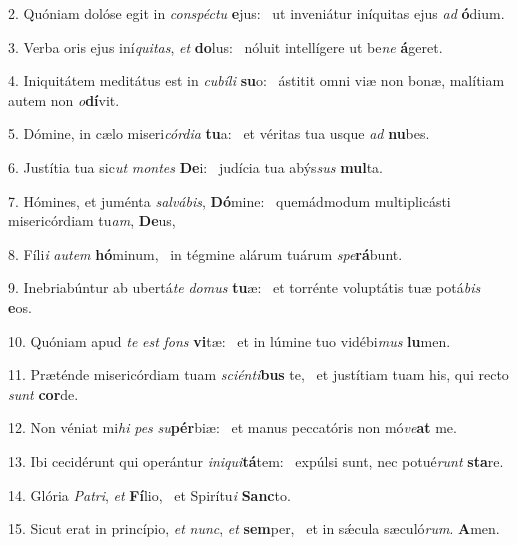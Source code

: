 2. Quóniam dolóse egit in \textit{con}\textit{spéc}\textit{tu} \textbf{e}jus: \ast\  ut inveniátur iníquitas ejus \textit{ad} \textbf{ó}dium.\

3. Verba oris ejus iní\textit{qui}\textit{tas}, \textit{et} \textbf{do}lus: \ast\  nóluit intellígere ut be\textit{ne} \textbf{á}geret.\

4. Iniquitátem meditátus est in \textit{cu}\textit{bí}\textit{li} \textbf{su}o: \ast\  ástitit omni viæ non bonæ, malítiam autem non \textit{o}\textbf{dí}vit.\

5. Dómine, in cælo miseri\textit{cór}\textit{di}\textit{a} \textbf{tu}a: \ast\  et véritas tua usque \textit{ad} \textbf{nu}bes.\

6. Justítia tua sic\textit{ut} \textit{mon}\textit{tes} \textbf{De}i: \ast\  judícia tua abýs\textit{sus} \textbf{mul}ta.\

7. Hómines, et juménta \textit{sal}\textit{vá}\textit{bis}, \textbf{Dó}mine: \ast\  quemádmodum multiplicásti misericórdiam tu\textit{am}, \textbf{De}us,\

8. Fíli\textit{i} \textit{au}\textit{tem} \textbf{hó}minum, \ast\  in tégmine alárum tuárum \textit{spe}\textbf{rá}bunt.\

9. Inebriabúntur ab ubertá\textit{te} \textit{do}\textit{mus} \textbf{tu}æ: \ast\  et torrénte voluptátis tuæ potá\textit{bis} \textbf{e}os.\

10. Quóniam apud \textit{te} \textit{est} \textit{fons} \textbf{vi}tæ: \ast\  et in lúmine tuo vidébi\textit{mus} \textbf{lu}men.\

11. Præténde misericórdiam tuam \textit{sci}\textit{én}\textit{ti}\textbf{bus} te, \ast\  et justítiam tuam his, qui recto \textit{sunt} \textbf{cor}de.\

12. Non véniat mi\textit{hi} \textit{pes} \textit{su}\textbf{pér}biæ: \ast\  et manus peccatóris non mó\textit{ve}\textbf{at} me.\

13. Ibi cecidérunt qui operántur \textit{in}\textit{i}\textit{qui}\textbf{tá}tem: \ast\  expúlsi sunt, nec potué\textit{runt} \textbf{sta}re.\

14. Glória \textit{Pa}\textit{tri}, \textit{et} \textbf{Fí}lio, \ast\  et Spirítu\textit{i} \textbf{Sanc}to.\

15. Sicut erat in princípio, \textit{et} \textit{nunc}, \textit{et} \textbf{sem}per, \ast\  et in sǽcula sæculó\textit{rum}. \textbf{A}men.\

